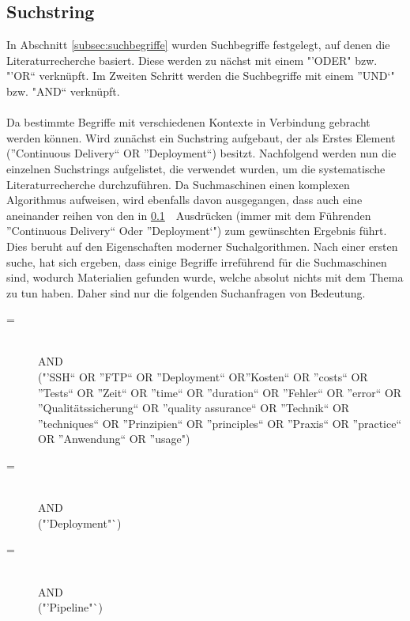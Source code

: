 \subsection{Suchstring}
\label{subsec:suchstring}
In Abschnitt \ref{subsec:suchbegriffe}  wurden Suchbegriffe festgelegt, auf denen die Literaturrecherche basiert. Diese werden zu nächst mit einem "'ODER" bzw. "'OR"` verknüpft. Im Zweiten Schritt werden die Suchbegriffe mit einem "'UND`" bzw. "AND"` verknüpft.
\\\\
Da bestimmte Begriffe mit verschiedenen Kontexte in Verbindung gebracht werden können. Wird zunächst ein Suchstring aufgebaut, der als Erstes Element ("'Continuous Delivery"` OR "'Deployment"`) besitzt. Nachfolgend werden nun die einzelnen Suchstrings aufgelistet, die verwendet wurden, um die systematische Literaturrecherche durchzuführen. Da Suchmaschinen einen komplexen Algorithmus aufweisen, wird ebenfalls davon ausgegangen, dass auch eine aneinander reihen von den in \ref{subsec:suchstring}\ \ Ausdrücken (immer mit dem Führenden "'Continuous Delivery"` Oder "'Deployment`") zum gewünschten Ergebnis führt. Dies beruht auf den Eigenschaften moderner Suchalgorithmen.
Nach einer ersten suche, hat sich ergeben, dass einige Begriffe irreführend für die Suchmaschinen sind, wodurch Materialien gefunden wurde, welche absolut nichts mit dem Thema zu tun haben. Daher sind nur die folgenden Suchanfragen von Bedeutung.

\begin{description}
	\item[ =] \suchstringPrefix \\AND\\ ("'SSH"` OR "'FTP"` OR "'Deployment"` OR"'Kosten"` OR "'costs"` OR "'Tests"` OR "'Zeit"` OR "'time"` OR "'duration"` OR "'Fehler"` OR "'error"` OR "'Qualitätssicherung"` OR "'quality assurance"` OR "'Technik"` OR "'techniques"` OR "'Prinzipien"` OR "'principles"` OR "'Praxis"` OR "'practice"` OR "'Anwendung"` OR "'usage")
    
    \item[ =] \suchstringPrefix \\AND\\ ("'Deployment"`)
    
    \item[ =] \suchstringPrefix \\AND\\ ("'Pipeline"`)
\end{description}

